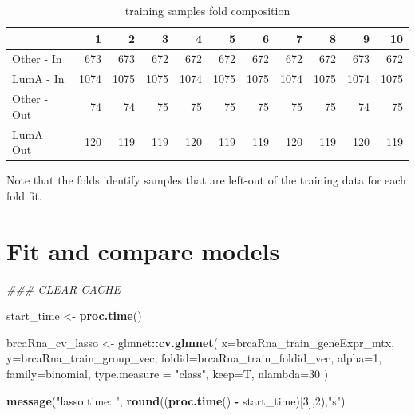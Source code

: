 \documentclass[
]{book}
\newenvironment{Shaded}{\begin{snugshade}}{\end{snugshade}}
\newcommand{\CommentTok}[1]{\textcolor[rgb]{0.56,0.35,0.01}{\textit{#1}}}
\newcommand{\DataTypeTok}[1]{\textcolor[rgb]{0.13,0.29,0.53}{#1}}
\newcommand{\DecValTok}[1]{\textcolor[rgb]{0.00,0.00,0.81}{#1}}
\newcommand{\KeywordTok}[1]{\textcolor[rgb]{0.13,0.29,0.53}{\textbf{#1}}}
\newcommand{\NormalTok}[1]{#1}
\newcommand{\OperatorTok}[1]{\textcolor[rgb]{0.81,0.36,0.00}{\textbf{#1}}}
\newcommand{\StringTok}[1]{\textcolor[rgb]{0.31,0.60,0.02}{#1}}
\begin{document}
\begin{table}

\caption{\label{tab:brcaRna-glmnetFit-getTrainFolds}training samples fold composition}
\centering
\begin{tabular}[t]{l|r|r|r|r|r|r|r|r|r|r}
\hline
  & 1 & 2 & 3 & 4 & 5 & 6 & 7 & 8 & 9 & 10\\
\hline
Other - In & 673 & 673 & 672 & 672 & 672 & 672 & 672 & 672 & 673 & 672\\
\hline
LumA - In & 1074 & 1075 & 1075 & 1074 & 1075 & 1075 & 1074 & 1075 & 1074 & 1075\\
\hline
Other - Out & 74 & 74 & 75 & 75 & 75 & 75 & 75 & 75 & 74 & 75\\
\hline
LumA - Out & 120 & 119 & 119 & 120 & 119 & 119 & 120 & 119 & 120 & 119\\
\hline
\end{tabular}
\end{table}

Note that the folds identify samples that are left-out of the training
data for each fold fit.

\hypertarget{fit-and-compare-models-1}{%
\section{Fit and compare models}\label{fit-and-compare-models-1}}

\begin{Shaded}
\begin{Highlighting}[]
\CommentTok{\#\#\# CLEAR CACHE}

\NormalTok{start\_time <{-}}\StringTok{  }\KeywordTok{proc.time}\NormalTok{()}

\NormalTok{brcaRna\_cv\_lasso <{-}}\StringTok{ }\NormalTok{glmnet}\OperatorTok{::}\KeywordTok{cv.glmnet}\NormalTok{(}
 \DataTypeTok{x=}\NormalTok{brcaRna\_train\_geneExpr\_mtx,}
 \DataTypeTok{y=}\NormalTok{brcaRna\_train\_group\_vec,}
 \DataTypeTok{foldid=}\NormalTok{brcaRna\_train\_foldid\_vec,}
 \DataTypeTok{alpha=}\DecValTok{1}\NormalTok{,}
 \DataTypeTok{family=}\StringTok{\textquotesingle{}binomial\textquotesingle{}}\NormalTok{, }
 \DataTypeTok{type.measure =} \StringTok{"class"}\NormalTok{,}
 \DataTypeTok{keep=}\NormalTok{T,}
 \DataTypeTok{nlambda=}\DecValTok{30}
\NormalTok{)}

\KeywordTok{message}\NormalTok{(}\StringTok{"lasso time: "}\NormalTok{, }\KeywordTok{round}\NormalTok{((}\KeywordTok{proc.time}\NormalTok{() }\OperatorTok{{-}}\StringTok{ }\NormalTok{start\_time)[}\DecValTok{3}\NormalTok{],}\DecValTok{2}\NormalTok{),}\StringTok{"s"}\NormalTok{)}
\end{Highlighting}
\end{Shaded}
\end{document}
